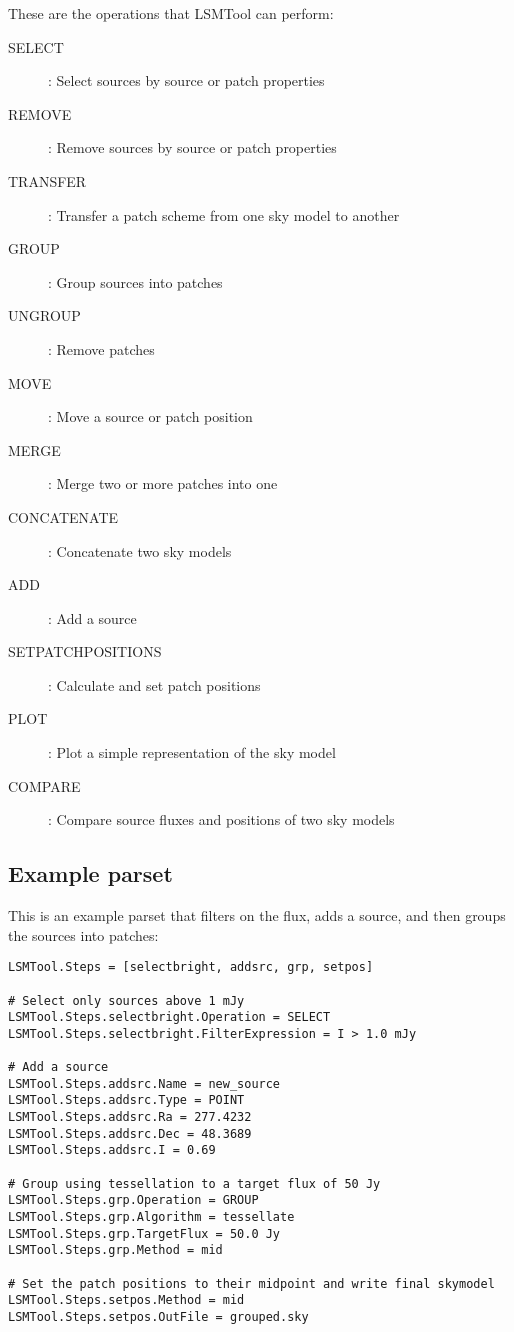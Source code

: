 \documentclass[structabstract]{article}
\begin{document}
These are the operations that LSMTool can perform:
\begin{description}
 \item[SELECT]: Select sources by source or patch properties
 \item[REMOVE]: Remove sources by source or patch properties
 \item[TRANSFER]: Transfer a patch scheme from one sky model to another
 \item[GROUP]: Group sources into patches
 \item[UNGROUP]: Remove patches
 \item[MOVE]: Move a source or patch position
 \item[MERGE]: Merge two or more patches into one
 \item[CONCATENATE]: Concatenate two sky models
 \item[ADD]: Add a source
 \item[SETPATCHPOSITIONS]: Calculate and set patch positions
 \item[PLOT]: Plot a simple representation of the sky model
 \item[COMPARE]: Compare source fluxes and positions of two sky models
\end{description}


\subsection{Example parset}
\label{lsmtool:parset}

This is an example parset that filters on the flux, adds a source, and then groups the sources into patches:
\begin{verbatim}
LSMTool.Steps = [selectbright, addsrc, grp, setpos]

# Select only sources above 1 mJy
LSMTool.Steps.selectbright.Operation = SELECT
LSMTool.Steps.selectbright.FilterExpression = I > 1.0 mJy

# Add a source
LSMTool.Steps.addsrc.Name = new_source
LSMTool.Steps.addsrc.Type = POINT
LSMTool.Steps.addsrc.Ra = 277.4232
LSMTool.Steps.addsrc.Dec = 48.3689
LSMTool.Steps.addsrc.I = 0.69

# Group using tessellation to a target flux of 50 Jy
LSMTool.Steps.grp.Operation = GROUP
LSMTool.Steps.grp.Algorithm = tessellate
LSMTool.Steps.grp.TargetFlux = 50.0 Jy
LSMTool.Steps.grp.Method = mid

# Set the patch positions to their midpoint and write final skymodel
LSMTool.Steps.setpos.Method = mid
LSMTool.Steps.setpos.OutFile = grouped.sky
\end{verbatim}
\end{document}
